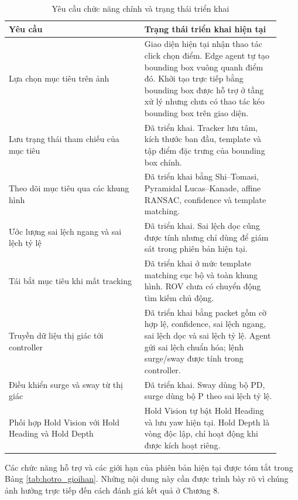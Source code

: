 \documentclass[../DoAn.tex]{subfiles}
\begin{document}
\begin{table}[htbp]
    \centering
    \caption{Yêu cầu chức năng chính và trạng thái triển khai}
    \label{tab:yeucau_trangthai}
    \renewcommand{\arraystretch}{1.25}
    \begin{tabular}{|p{0.46\linewidth}|p{0.46\linewidth}|}
        \hline
        \textbf{Yêu cầu} & \textbf{Trạng thái triển khai hiện tại} \\
        \hline
        Lựa chọn mục tiêu trên ảnh & Giao diện hiện tại nhận thao tác click chọn điểm. Edge agent tự tạo bounding box vuông quanh điểm đó. Khởi tạo trực tiếp bằng bounding box được hỗ trợ ở tầng xử lý nhưng chưa có thao tác kéo bounding box trên giao diện. \\
        \hline
        Lưu trạng thái tham chiếu của mục tiêu & Đã triển khai. Tracker lưu tâm, kích thước ban đầu, template và tập điểm đặc trưng của bounding box chính. \\
        \hline
        Theo dõi mục tiêu qua các khung hình & Đã triển khai bằng Shi--Tomasi, Pyramidal Lucas--Kanade, affine RANSAC, confidence và template matching. \\
        \hline
        Ước lượng sai lệch ngang và sai lệch tỷ lệ & Đã triển khai. Sai lệch dọc cũng được tính nhưng chỉ dùng để giám sát trong phiên bản hiện tại. \\
        \hline
        Tái bắt mục tiêu khi mất tracking & Đã triển khai ở mức template matching cục bộ và toàn khung hình. ROV chưa có chuyển động tìm kiếm chủ động. \\
        \hline
        Truyền dữ liệu thị giác tới controller & Đã triển khai bằng packet gồm cờ hợp lệ, confidence, sai lệch ngang, sai lệch dọc và sai lệch tỷ lệ. Agent gửi sai lệch chuẩn hóa; lệnh surge/sway được tính trong controller. \\
        \hline
        Điều khiển surge và sway từ thị giác & Đã triển khai. Sway dùng bộ PD, surge dùng bộ P theo sai lệch tỷ lệ. \\
        \hline
        Phối hợp Hold Vision với Hold Heading và Hold Depth & Hold Vision tự bật Hold Heading và lưu yaw hiện tại. Hold Depth là vòng độc lập, chỉ hoạt động khi được kích hoạt riêng. \\
        \hline
    \end{tabular}
\end{table}

Các chức năng hỗ trợ và các giới hạn của phiên bản hiện tại được tóm tắt trong Bảng \ref{tab:hotro_gioihan}. Những nội dung này cần được trình bày rõ vì chúng ảnh hưởng trực tiếp đến cách đánh giá kết quả ở Chương 8.
\end{document}
